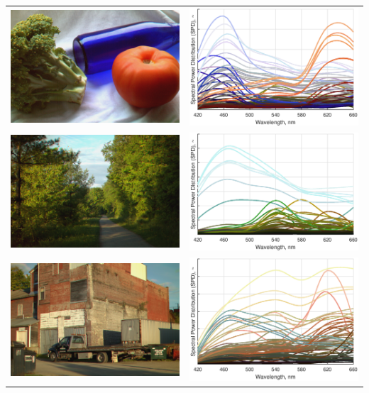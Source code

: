 \documentclass[twocolumn,10pt]{asme2ej}
\begin{document}
\begin{table}[H]
\centering
\begin{tabular}{cc}
\includegraphics[width=0.40\linewidth]{IMG_4795_hyperspectral_1500_px_06-Aug-2021_14-12-44.jpg} & \includegraphics[width=0.40\linewidth]{broccoli_bottle_tomato.eps} \\
\includegraphics[width=0.40\linewidth]{IMG_4422_hyperspectral_1500_px_06-Aug-2021_14-14-50.jpg} & \includegraphics[width=0.40\linewidth]{vermont_path.eps} \\
\includegraphics[width=0.40\linewidth]{IMG_4407_hyperspectral_1500_px_06-Aug-2021_14-08-54} & \includegraphics[width=0.40\linewidth]{truck_SPDs.eps} \\
\end{tabular}
\label{reconstructed_images}
\end{table}
\end{document}
